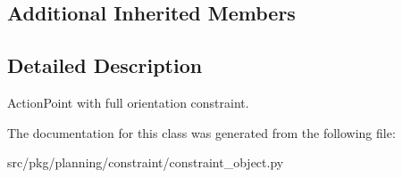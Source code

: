 \subsection*{Additional Inherited Members}


\subsection{Detailed Description}
Action\+Point with full orientation constraint. 

The documentation for this class was generated from the following file\+:\begin{DoxyCompactItemize}
\item 
src/pkg/planning/constraint/constraint\+\_\+object.\+py\end{DoxyCompactItemize}
